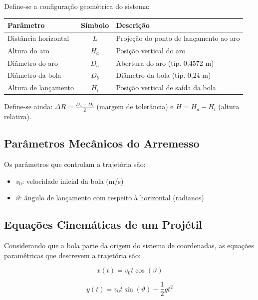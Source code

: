 \documentclass[12pt,a4paper]{article}
\begin{document}
Define-se a configuração geométrica do sistema:

\begin{table}[h]
\centering
\begin{tabular}{|l|c|l|}
\hline
\textbf{Parâmetro} & \textbf{Símbolo} & \textbf{Descrição} \\
\hline
Distância horizontal & $L$ & Projeção do ponto de lançamento ao aro \\
Altura do aro & $H_a$ & Posição vertical do aro \\
Diâmetro do aro & $D_a$ & Abertura do aro (típ. 0,4572 m) \\
Diâmetro da bola & $D_b$ & Diâmetro da bola (típ. 0,24 m) \\
Altura de lançamento & $H_l$ & Posição vertical de saída da bola \\
\hline
\end{tabular}
\end{table}

Define-se ainda: $\Delta R = \frac{D_a - D_b}{2}$ (margem de tolerância) e $H = H_a - H_l$ (altura relativa).

\subsection{Parâmetros Mecânicos do Arremesso}

Os parâmetros que controlam a trajetória são:

\begin{itemize}
    \item $v_0$: velocidade inicial da bola (m/s)
    \item $\vartheta$: ângulo de lançamento com respeito à horizontal (radianos)
\end{itemize}

\subsection{Equações Cinemáticas de um Projétil}

Considerando que a bola parte da origem do sistema de coordenadas, as equações paramétricas que descrevem a trajetória são:

\begin{equation}
x(t) = v_0 t \cos(\vartheta)
\end{equation}

\begin{equation}
y(t) = v_0 t \sin(\vartheta) - \frac{1}{2} g t^2
\end{equation}
\end{document}

